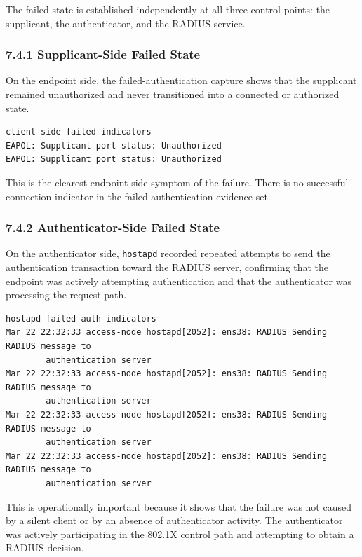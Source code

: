\documentclass[11pt]{article}
\begin{document}
The failed state is established independently at all three control points: the supplicant, the authenticator, and the RADIUS service.

\subsubsection{7.4.1 Supplicant-Side Failed State}
\label{sec:supplicant-side-failed-state}

On the endpoint side, the failed-authentication capture shows that the supplicant remained unauthorized and never transitioned into a connected or authorized state.

\begin{verbatim}
client-side failed indicators
EAPOL: Supplicant port status: Unauthorized
EAPOL: Supplicant port status: Unauthorized
\end{verbatim}

This is the clearest endpoint-side symptom of the failure. There is no successful connection indicator in the failed-authentication evidence set.

\subsubsection{7.4.2 Authenticator-Side Failed State}
\label{sec:authenticator-side-failed-state}

On the authenticator side, \texttt{hostapd} recorded repeated attempts to send the authentication transaction toward the RADIUS server, confirming that the endpoint was actively attempting authentication and that the authenticator was processing the request path.

\begin{verbatim}
hostapd failed-auth indicators
Mar 22 22:32:33 access-node hostapd[2052]: ens38: RADIUS Sending RADIUS message to 
        authentication server
Mar 22 22:32:33 access-node hostapd[2052]: ens38: RADIUS Sending RADIUS message to 
        authentication server
Mar 22 22:32:33 access-node hostapd[2052]: ens38: RADIUS Sending RADIUS message to 
        authentication server
Mar 22 22:32:33 access-node hostapd[2052]: ens38: RADIUS Sending RADIUS message to 
        authentication server
\end{verbatim}

This is operationally important because it shows that the failure was not caused by a silent client or by an absence of authenticator activity. The authenticator was actively participating in the 802.1X control path and attempting to obtain a RADIUS decision.
\end{document}
